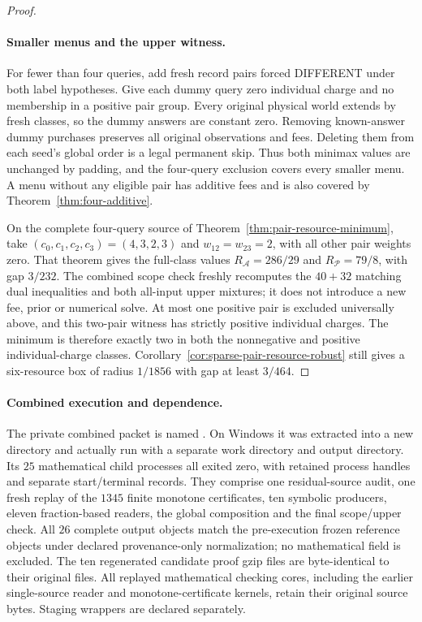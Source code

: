 \begin{proof}
\paragraph*{Smaller menus and the upper witness.}
For fewer than four queries, add fresh record pairs forced DIFFERENT
under both label hypotheses. Give each dummy query zero individual
charge and no membership in a positive pair group. Every original
physical world extends by fresh classes, so the dummy answers are
constant zero. Removing known-answer dummy purchases preserves all
original observations and fees. Deleting them from each seed's global
order is a legal permanent skip. Thus both minimax values are
unchanged by padding, and the four-query exclusion covers every
smaller menu. A menu without any eligible pair has additive fees and
is also covered by Theorem~\ref{thm:four-additive}.

On the complete four-query source of
Theorem~\ref{thm:pair-resource-minimum}, take
$(c_0,c_1,c_2,c_3)=(4,3,2,3)$ and $w_{12}=w_{23}=2$, with all other
pair weights zero. That theorem gives the full-class values
$R_{\mathcal A}=286/29$ and $R_{\mathcal P}=79/8$, with gap $3/232$.
The combined scope check freshly recomputes the $40+32$ matching dual
inequalities and both all-input upper mixtures; it does not introduce
a new fee, prior or numerical solve. At most one positive pair is
excluded universally above, and this two-pair witness has strictly
positive individual charges. The minimum is therefore exactly two
in both the nonnegative and positive individual-charge classes.
Corollary~\ref{cor:sparse-pair-resource-robust} still gives a
six-resource box of radius $1/1856$ with gap at least $3/464$.
\end{proof}

\paragraph*{Combined execution and dependence.}
The private combined packet is named
. On Windows it
was extracted into a new directory and actually run with a separate
work directory and output directory. Its $25$ mathematical child
processes all exited zero, with retained process handles and separate
start/terminal records. They comprise one residual-source audit, one
fresh replay of the $1345$ finite monotone certificates, ten symbolic
producers, eleven fraction-based readers, the global composition and
the final scope/upper check. All $26$ complete output objects match
the pre-execution frozen reference objects under declared
provenance-only normalization; no mathematical field is excluded.
The ten regenerated candidate proof gzip files are byte-identical
to their original files. All replayed mathematical checking cores,
including the earlier single-source reader and monotone-certificate
kernels, retain their original source bytes. Staging wrappers are
declared separately.

